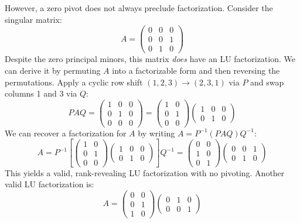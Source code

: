 \documentclass[10pt,twoside]{siamart1116}
\numberwithin{theorem}{section}
\begin{document}
However, a zero pivot does not always preclude factorization. Consider the singular matrix:
\[
	A = \begin{pmatrix} 0 & 0 & 0 \\ 0 & 0 & 1 \\ 0 & 1 & 0 \end{pmatrix}
\]
Despite the zero principal minors, this matrix \emph{does} have an LU factorization. We can derive it by permuting $A$ into a factorizable form and then reversing the permutations. Apply a cyclic row shift $(1,2,3) \to (2,3,1)$ via $P$ and swap columns 1 and 3 via $Q$:
\[
	PAQ = \begin{pmatrix} 1 & 0 & 0 \\ 0 & 1 & 0 \\ 0 & 0 & 0 \end{pmatrix}
	= \begin{pmatrix} 1 & 0 \\ 0 & 1 \\ 0 & 0 \end{pmatrix}
	\begin{pmatrix} 1 & 0 & 0 \\ 0 & 1 & 0 \end{pmatrix}
\]
We can recover a factorization for $A$ by writing $A = P^{-1} (PAQ) Q^{-1}$:
\[
	A = P^{-1} \left[ \begin{pmatrix} 1 & 0 \\ 0 & 1 \\ 0 & 0 \end{pmatrix}
		\begin{pmatrix} 1 & 0 & 0 \\ 0 & 1 & 0 \end{pmatrix} \right] Q^{-1} =
	\begin{pmatrix} 0 & 0 \\ 1 & 0 \\ 0 & 1 \end{pmatrix}
	\begin{pmatrix} 0 & 0 & 1 \\ 0 & 1 & 0 \end{pmatrix}
\]
This yields a valid, rank-revealing LU factorization with no pivoting. Another valid LU factorization is:
\[
	A = \begin{pmatrix} 0 & 0 \\ 0 & 1 \\ 1 & 0 \end{pmatrix}
	\begin{pmatrix} 0 & 1 & 0 \\ 0 & 0 & 1 \end{pmatrix}
\]
\end{document}
